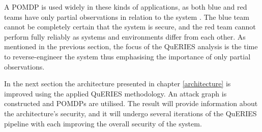 A POMDP is used widely in these kinds of applications, as both blue and
red teams have only partial observations in relation to the system
\cite{mcabeeMarkov}. The blue team cannot be completely certain that
the system is secure, and the red team cannot perform fully reliably as
systems and environments differ from each other. As mentioned in the
previous section, the focus of the QuERIES analysis is the time to
reverse-engineer the system thus emphasising the importance of only
partial observations.

In the next section the architecture presented in chapter
\ref{architecture} is improved using the applied QuERIES methodology. An
attack graph is constructed and POMDPs are utilised. The result will
provide information about the architecture's security, and it will
undergo several iterations of the QuERIES pipeline with each improving
the overall security of the system.
